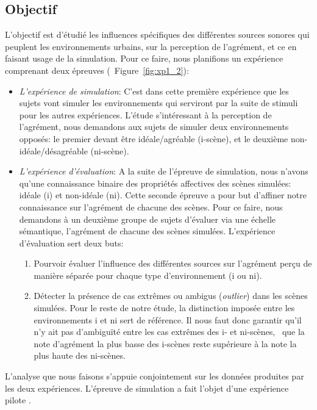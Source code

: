 \subsection{Objectif}

L'objectif est d'étudié les influences spécifiques des différentes sources sonores qui peuplent les  environnements urbains, sur la perception de l'agrément, et ce en faisant usage de la simulation. Pour ce faire, nous planifions un expérience comprenant deux épreuves (\Cf~Figure~\ref{fig:xp1_2}):

\begin{itemize}
\item \emph{L'expérience de simulation}: C'est dans cette première expérience que les sujets vont simuler les environnements qui serviront par la suite de stimuli pour les autres expériences. L'étude s’intéressant à la perception de l'agrément, nous demandons aux sujets de simuler deux environnements opposés: le premier devant être idéale/agréable (i-scène), et le deuxième non-idéale/désagréable (ni-scène).
\item \emph{L'expérience d'évaluation}: A la suite de l'épreuve de simulation, nous n'avons qu'une connaissance binaire des propriétés affectives des scènes simulées: idéale (i) et non-idéale (ni). Cette seconde épreuve a pour but d'affiner notre connaissance sur l'agrément de chacune des scènes. Pour ce faire, nous demandons à un deuxième groupe de sujets d'évaluer via une échelle sémantique, l'agrément de chacune des scènes simulées. L'expérience d'évaluation sert deux buts:
\begin{enumerate}
\item Pourvoir évaluer l'influence des différentes sources sur l'agrément perçu de manière séparée pour chaque type d'environnement (i ou ni).
\item Détecter la présence de cas extrêmes ou ambigus (\emph{outlier}) dans les scènes simulées. Pour le reste de notre étude, la distinction imposée entre les environnements i et ni sert de référence. Il nous faut donc garantir qu'il n'y ait pas d’ambiguïté entre les cas extrêmes des i- et ni-scènes, \ie~que la note d'agrément la plus basse des i-scènes reste supérieure à la note la plus haute des ni-scènes.
\end{enumerate}

\end{itemize}

L'analyse que nous faisons s'appuie conjointement sur les données produites par les deux expériences. L'épreuve de simulation a fait l'objet d'une expérience pilote \citep{lafay2013atiam,lafay2014new}.


